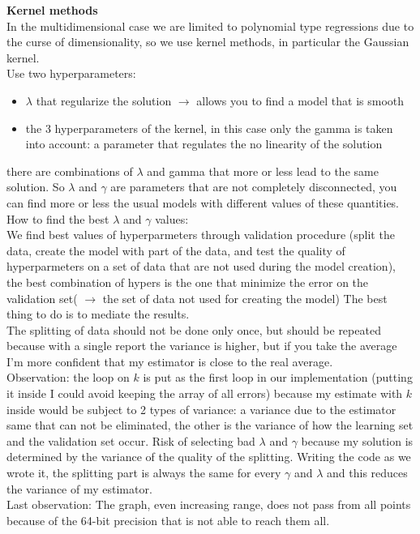 \textbf {Kernel methods}\\

In the multidimensional case we are limited to polynomial type regressions due to the curse of dimensionality, so we use kernel methods, in particular the Gaussian kernel.\\
Use two hyperparameters:
\begin{itemize}
	\item $\lambda$ that regularize the solution $\rightarrow$ allows you to find a model that is smooth
	\item the 3 hyperparameters of the kernel, in this case only the gamma is taken into account: a parameter that regulates the no linearity of the solution
\end{itemize}
there are combinations of $\lambda$ and gamma that more or less lead to the same solution. So $\lambda$ and $\gamma$ are parameters that are not completely disconnected, you can find more or less the usual models with different values of these quantities.\\
How to find the best $\lambda$ and $\gamma$ values:\\
We find best values of hyperparmeters through validation procedure (split the data, create the model with part of the data, and test the quality of hyperparmeters on a set of data that are not used during the model creation), the best combination of hypers is the one that minimize the error on the validation set( $\rightarrow$ the set of data not used for creating the model)
The best thing to do is to mediate the results.\\
The splitting of data should not be done only once, but should be repeated because with a single report the variance is higher, but if you take the average I'm more confident that my estimator is close to the real average.\\
Observation: the loop on $k$ is put as the first loop in our implementation (putting it inside I could avoid keeping the array of all errors) because my estimate with $k$ inside would be subject to 2 types of variance: a variance due to the estimator same that can not be eliminated, the other is the variance of how the learning set and the validation set occur. Risk of selecting bad $\lambda$ and $\gamma$ because my solution is determined by the variance of the quality of the splitting. Writing the code as we wrote it, the splitting part is always the same for every $\gamma$ and $\lambda$ and this reduces the variance of my estimator.\\
Last observation: The graph, even increasing range, does not pass from all points because of the 64-bit precision that is not able to reach them all.

